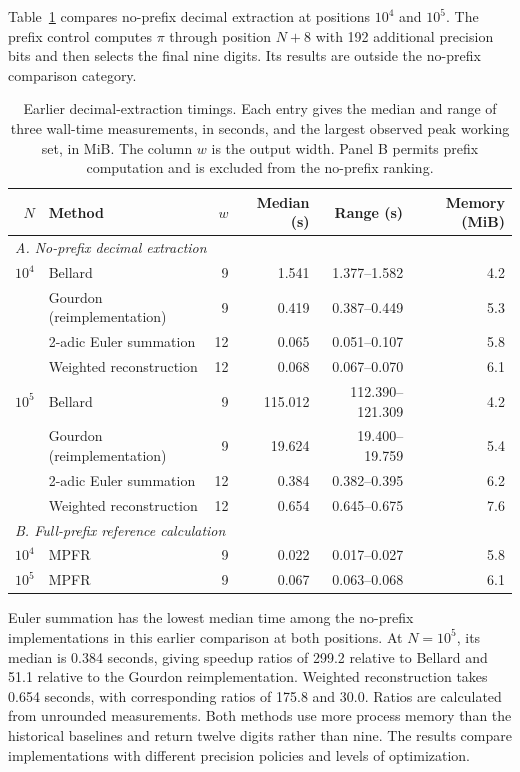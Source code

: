 \documentclass[11pt]{article}
\numberwithin{equation}{section}
\theoremstyle{definition}
\begin{document}
Table~\ref{tab:external-performance} compares no-prefix decimal
extraction at positions $10^4$ and $10^5$. The prefix control computes
$\pi$ through position $N+8$ with 192 additional precision bits and
then selects the final nine digits. Its results are outside the
no-prefix comparison category.

\begin{table}[htbp]
\centering
\small
\caption{Earlier decimal-extraction timings. Each entry gives the median and
range of three wall-time measurements, in seconds, and the largest
observed peak working set, in MiB. The column $w$ is the output width.
Panel B permits prefix computation and is excluded from the
no-prefix ranking.}
\label{tab:external-performance}
\setlength{\tabcolsep}{4pt}
\begin{tabular}{rlrrrr}
\toprule
$N$ & Method & $w$ & Median (s) & Range (s) & Memory (MiB)\\
\midrule
\multicolumn{6}{l}{\textit{A. No-prefix decimal extraction}}\\
\addlinespace[2pt]
$10^4$ & Bellard & 9 & 1.541 & 1.377--1.582 & 4.2\\
 & Gourdon (reimplementation) & 9 & 0.419 & 0.387--0.449 & 5.3\\
 & 2-adic Euler summation & 12 & 0.065 & 0.051--0.107 & 5.8\\
 & Weighted reconstruction & 12 & 0.068 & 0.067--0.070 & 6.1\\
\addlinespace
$10^5$ & Bellard & 9 & 115.012 & 112.390--121.309 & 4.2\\
 & Gourdon (reimplementation) & 9 & 19.624 & 19.400--19.759 & 5.4\\
 & 2-adic Euler summation & 12 & 0.384 & 0.382--0.395 & 6.2\\
 & Weighted reconstruction & 12 & 0.654 & 0.645--0.675 & 7.6\\
\midrule
\multicolumn{6}{l}{\textit{B. Full-prefix reference calculation}}\\
\addlinespace[2pt]
$10^4$ & MPFR & 9 & 0.022 & 0.017--0.027 & 5.8\\
$10^5$ & MPFR & 9 & 0.067 & 0.063--0.068 & 6.1\\
\bottomrule
\end{tabular}
\end{table}

Euler summation has the lowest median time among the no-prefix
implementations in this earlier comparison at both positions. At $N=10^5$, its
median is 0.384 seconds, giving speedup ratios of 299.2 relative
to Bellard and 51.1 relative to the Gourdon reimplementation.
Weighted reconstruction takes 0.654 seconds, with corresponding
ratios of 175.8 and 30.0. Ratios are calculated from unrounded
measurements. Both methods use more process memory than the
historical baselines and return twelve digits rather than nine.
The results compare implementations with different precision
policies and levels of optimization.
\end{document}
